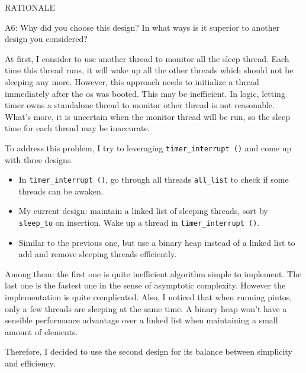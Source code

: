 \begin{aspect}{RATIONALE}
	\begin{qc}
		A6: Why did you choose this design?  In what ways is it superior to another design you considered?
	\end{qc}
	At first, I consider to use another thread to monitor all the sleep thread. Each time this thread runs, it will wake up all the other threads which should not be sleeping any more. However, this approach needs to initialize a thread immediately after the os was booted. This may be inefficient. In logic, letting timer owns a standalone thread to monitor other thread is not reasonable. What's more, it is uncertain when the monitor thread will be run, so the sleep time for each thread may be inaccurate.

	To address this problem, I try to leveraging \lstinline{timer_interrupt ()} and come up with three designs.
	\begin{itemize}
		\item In \lstinline{timer_interrupt ()}, go through all threads \lstinline{all_list} to check if some threads can be awaken.
		\item My current design: maintain a linked list of sleeping threads, sort by \lstinline{sleep_to} on insertion. Wake up a thread in \lstinline{timer_interrupt ()}.
		\item Similar to the previous one, but use a binary heap instead of a linked list to add and remove sleeping threads efficiently.
	\end{itemize}

    Among them: the first one is quite inefficient algorithm simple to implement.
    The last one is the fastest one in the sense of asymptotic complexity.
    However the implementation is quite complicated.
    Also, I noticed that when running pintos, only a few threads are sleeping at the same time.
    A binary heap won't have a sensible performance advantage over a linked list when maintaining a small amount of elements.

	Therefore, I decided to use the second design for its balance between simplicity and efficiency.
\end{aspect}
